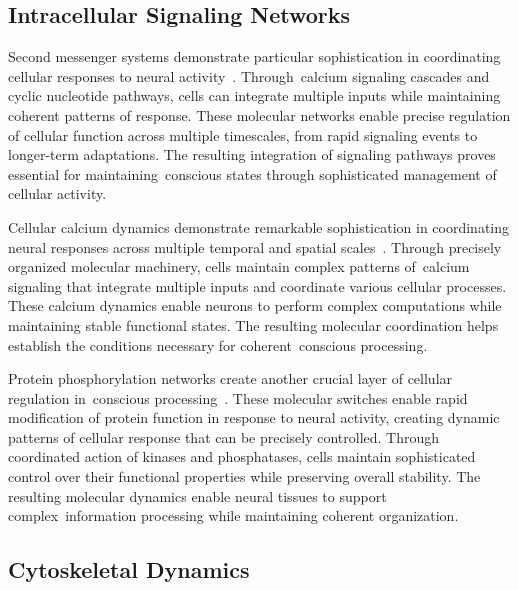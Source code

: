 \subsection*{Intracellular Signaling Networks~}

Second messenger systems demonstrate particular sophistication in coordinating cellular responses to neural activity~\cite{Bashir2019, barrett2017emotions}. Through~calcium signaling cascades and cyclic nucleotide pathways, cells can integrate multiple inputs while maintaining coherent patterns of response. These molecular networks enable precise regulation of cellular function across multiple timescales, from rapid signaling events to longer-term adaptations. The resulting integration of signaling pathways proves essential for maintaining~conscious states through sophisticated management of cellular activity.

Cellular calcium dynamics demonstrate remarkable sophistication in coordinating neural responses across multiple temporal and spatial scales~\cite{Reese2016, Berridge2014}. Through precisely organized molecular machinery, cells maintain complex patterns of~calcium signaling that integrate multiple inputs and coordinate various cellular processes. These calcium dynamics enable neurons to perform complex computations while maintaining stable functional states. The resulting molecular coordination helps establish the conditions necessary for coherent~conscious processing.

Protein phosphorylation networks create another crucial layer of cellular regulation in~conscious processing~\cite{Lane2018, Henzler-Wildman2007}. These molecular switches enable rapid modification of protein function in response to neural activity, creating dynamic patterns of cellular response that can be precisely controlled. Through coordinated action of kinases and phosphatases, cells maintain sophisticated control over their functional properties while preserving overall stability. The resulting molecular dynamics enable neural tissues to support complex~information processing while maintaining coherent organization.

\subsection*{Cytoskeletal Dynamics~}

